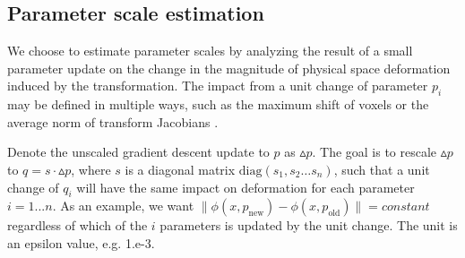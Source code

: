 \documentclass{llncs}
\begin{document}

\subsection{Parameter scale estimation}
We choose to estimate parameter scales by analyzing the result of a
small parameter update on the change in the magnitude of physical space deformation
induced by the transformation.  The impact from a unit change of
parameter $p_i$ may be defined in multiple ways, such as the maximum shift of
voxels or the average norm of transform Jacobians \cite{Jenkinson2001}.

Denote the unscaled gradient descent update to $p$ as $\vartriangle
p$.  The goal is to rescale $\vartriangle p$ to $q = s \cdot \vartriangle p$, where $s$ is a diagonal
matrix $\text{diag} (s_1, s_2 \ldots s_n)$, such that a unit change of $q_i$ will have
the same impact on deformation for each parameter $i = 1... n$.   
As an example, we want $ \| \phi(x,p_{\text{new}}) -
\phi(x,p_\text{old}) \| = constant $ regardless of which of the
$i$ parameters is updated by the unit change.  The unit is an epsilon
value, e.g. 1.e-3.
\end{document}
